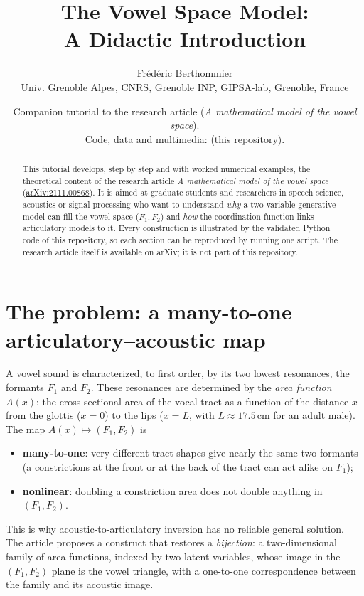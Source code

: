 \documentclass[11pt]{article}
\title{\bfseries The Vowel Space Model:\\[2pt] A Didactic Introduction}
\author{Fr\'ed\'eric Berthommier\\
\small Univ. Grenoble Alpes, CNRS, Grenoble INP, GIPSA-lab, Grenoble, France}
\date{\small Companion tutorial to the research article \arxivpaper{}
(\emph{A mathematical model of the vowel space}).\\
Code, data and multimedia: \repo{} (this repository).}
\newcommand{\arxivpaper}{\href{https://arxiv.org/abs/2111.00868}{arXiv:2111.00868}}
\theoremstyle{definition}
\theoremstyle{remark}
\newcommand{\Fone}{F_1}
\newcommand{\Ftwo}{F_2}
\begin{document}
\maketitle

\begin{abstract}
\noindent
This tutorial develops, step by step and with worked numerical examples,
the theoretical content of the research article \emph{A mathematical
model of the vowel space} (\arxivpaper{}).  It is aimed at graduate
students and researchers in speech science, acoustics or signal
processing who want to understand \emph{why} a two-variable generative
model can fill the vowel space ($\Fone,\Ftwo$) and \emph{how} the
coordination function links articulatory models to it.  Every construction
is illustrated by the validated Python code of this repository, so each
section can be reproduced by running one script.  The research article
itself is available on arXiv; it is not part of this repository.
\end{abstract}

\tableofcontents

\section{The problem: a many-to-one articulatory--acoustic map}

A vowel sound is characterized, to first order, by its two lowest
resonances, the formants $\Fone$ and $\Ftwo$.  These resonances are
determined by the \emph{area function} $A(x)$: the cross-sectional area
of the vocal tract as a function of the distance $x$ from the glottis
($x=0$) to the lips ($x=L$, with $L\approx 17.5$\,cm for an adult male).
The map $A(x)\mapsto(\Fone,\Ftwo)$ is
\begin{itemize}[nosep]
\item \textbf{many-to-one}: very different tract shapes give nearly the
      same two formants (a constrictions at the front or at the back of
      the tract can act alike on $\Fone$);
\item \textbf{nonlinear}: doubling a constriction area does not double
      anything in $(\Fone,\Ftwo)$.
\end{itemize}
This is why acoustic-to-articulatory inversion has no reliable general
solution.  The article proposes a construct that restores a
\emph{bijection}: a two-dimensional family of area functions, indexed by
two latent variables, whose image in the $(\Fone,\Ftwo)$ plane is the
vowel triangle, with a one-to-one correspondence between the family and
its acoustic image.
\end{document}
